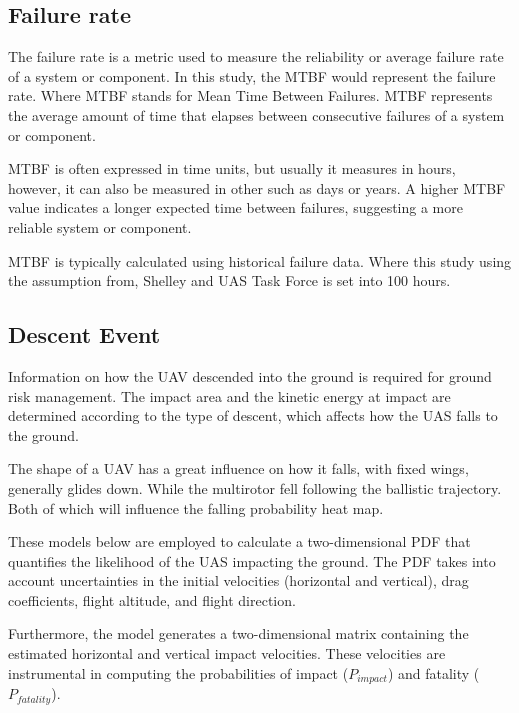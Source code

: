 \documentclass[12pt]{report}
\begin{document}
        \subsection{Failure rate}
        The failure rate is a metric used to measure the reliability or average failure rate of a system or component.
        In this study, the MTBF would represent the failure rate. Where MTBF stands for Mean Time Between Failures. MTBF
        represents the average amount of time that elapses between consecutive failures of a system or component.
            
        MTBF is often expressed in time units, but usually it measures in hours, however, it can also be measured in
        other such as days or years. A higher MTBF value indicates a longer expected time between failures, suggesting a
        more reliable system or component.
            
        MTBF is typically calculated using historical failure data. Where this study using the assumption from, Shelley
        \cite{shelley_model_2016} and UAS Task Force \cite{noauthor_unmanned_2015} is set into 100 hours. 

        \subsection{Descent Event}\label{sec:descent_events} Information on how the UAV descended into the ground is
        required for ground risk management. The impact area and the kinetic energy at impact are determined according
        to the type of descent, which affects how the UAS falls to the ground. 
            
        The shape of a UAV has a great influence on how it falls, with fixed wings, generally glides down. While the
        multirotor fell following the ballistic trajectory. Both of which will influence the falling probability heat
        map. 
            
        These models below are employed to calculate a two-dimensional PDF that quantifies the likelihood of the UAS
        impacting the ground. The PDF takes into account uncertainties in the initial velocities (horizontal and
        vertical), drag coefficients, flight altitude, and flight direction. 
            
        Furthermore, the model generates a two-dimensional matrix containing the estimated horizontal and vertical
        impact velocities. These velocities are instrumental in computing the probabilities of impact (\(P_{impact}\))
        and fatality (\(P_{fatality}\)).
\end{document}
